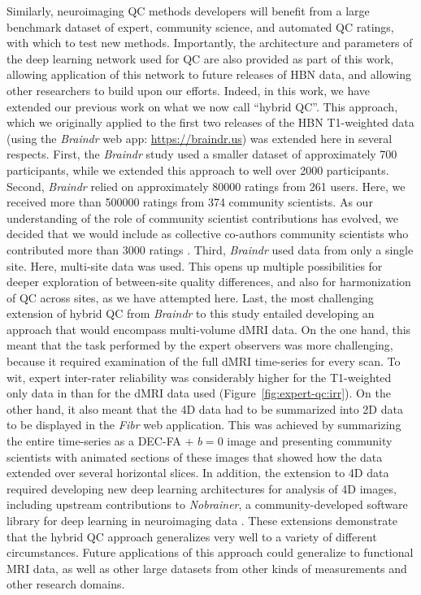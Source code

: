 \documentclass[fleqn,10pt,inline]{wlscirep}
\begin{document}
Similarly, neuroimaging QC methods developers will benefit from a large
benchmark dataset of expert, community science, and automated QC ratings, with
which to test new methods. Importantly, the architecture and parameters of the
deep learning network used for QC are also provided as part of this work,
allowing application of this network to future releases of HBN data, and
allowing other researchers to build upon our efforts. Indeed, in this work, we
have extended our previous work on what we now call ``hybrid QC''. This
approach, which we originally applied to the first two releases of the HBN
T1-weighted data \cite{keshavan2019-er} (using the \emph{Braindr} web app:
\url{https://braindr.us}) was extended here in several respects.
First, the \emph{Braindr} study used a smaller dataset of approximately 700
participants, while we extended this approach to well over \num{2000} participants.
Second, \emph{Braindr} relied on approximately \num{80000} ratings from
\num{261} users. Here, we received more than \num{500000} ratings from
\num{374} community scientists. As our understanding of the role of
community scientist contributions has evolved, we decided that we would
include as collective co-authors community scientists who contributed more
than \num{3000} ratings \cite{Ward-Fear2020-zq}.
Third, \emph{Braindr} used data from only a single site. Here, multi-site
data was used. This opens up multiple possibilities for deeper exploration of
between-site quality differences, and also for harmonization of QC across
sites, as we have attempted here.
Last, the most challenging extension of hybrid QC from \emph{Braindr} to
this study entailed developing an approach that would encompass multi-volume
dMRI data. On the one hand, this meant that the task performed by the expert
observers was more challenging, because it required examination of the full
dMRI time-series for every scan. To wit, expert inter-rater reliability was
considerably higher for the T1-weighted only data in \cite{keshavan2019-er}
than for the dMRI data used (Figure~\ref{fig:expert-qc:irr}).
On the other hand, it also meant that the 4D data had to be summarized into
2D data to be displayed in the \emph{Fibr} web application. This was
achieved by summarizing the entire time-series as a DEC-FA + $b=0$ image and
presenting community scientists with animated sections of these images that
showed how the data extended over several horizontal slices.
In addition, the extension to 4D data required developing new deep learning
architectures for analysis of 4D images, including upstream contributions to
\emph{Nobrainer}, a community-developed software library for deep learning
in neuroimaging data \cite{nobrainer}.
These extensions demonstrate that the hybrid QC approach generalizes very well
to a variety of different circumstances. Future applications of this approach
could generalize to functional MRI data, as well as other large datasets from
other kinds of measurements and other research domains.
\end{document}
